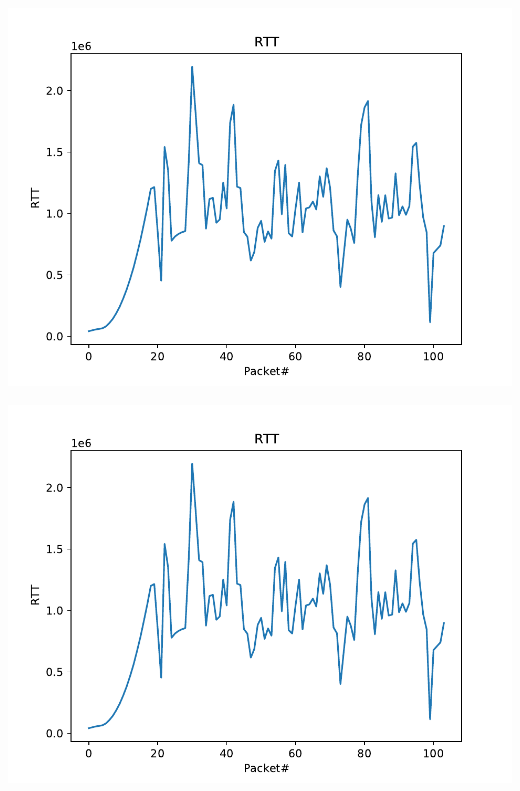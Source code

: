 \documentclass[12pt]{article}
\begin{document}
\begin{enumerate}
\begin{center}
	\includegraphics[page=2, width = 0.6 \textwidth]{images/plots.pdf}
\end{center}

\begin{center}
	\includegraphics[page=3, width = 0.6 \textwidth]{images/plots.pdf}
\end{center}

\end{enumerate}
\end{document}
